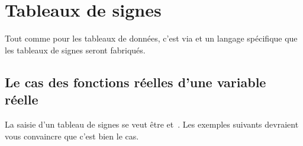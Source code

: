 \documentclass[10pt, a4paper]{article}
\begin{document}
\section{Tableaux de signes}

\begin{tdocnote}
	Tout comme pour les tableaux de données, c'est via  et un langage spécifique que les tableaux de signes seront fabriqués.
\end{tdocnote}




\subsection{Le cas des fonctions réelles d'une variable réelle}

La saisie d'un tableau de signes se veut être  et \,. Les exemples suivants devraient vous convaincre que c'est bien le cas.
\end{document}
